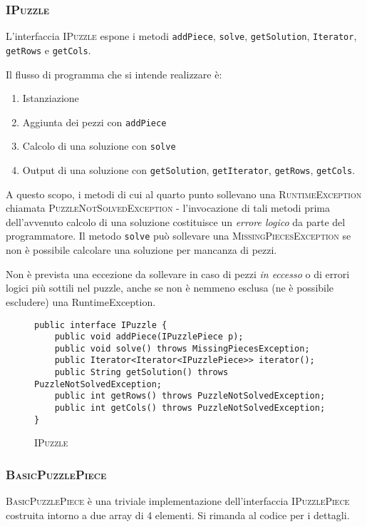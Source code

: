 \documentclass[a4paper]{article}
\newcommand{\Classname}[1]{\textsc{#1}}
\newcommand{\Ifacename}[1]{\textsc{#1}}
\newcommand{\Methodname}[1]{\texttt{#1}}
\begin{document}
\subsubsection{\Classname{IPuzzle}}
L'interfaccia \Ifacename{IPuzzle} espone i metodi \Methodname{addPiece}, \Methodname{solve}, \Methodname{getSolution}, \Methodname{Iterator}, \Methodname{getRows} e \Methodname{getCols}.

Il flusso di programma che si intende realizzare \`e:

\begin{enumerate}
\item Istanziazione
\item Aggiunta dei pezzi con \Methodname{addPiece}
\item Calcolo di una soluzione con \Methodname{solve}
\item Output di una soluzione con \Methodname{getSolution}, \Methodname{getIterator}, \Methodname{getRows}, \Methodname{getCols}.
\end{enumerate}

A questo scopo, i metodi di cui al quarto punto sollevano una \Classname{RuntimeException} chiamata \Classname{PuzzleNotSolvedException} - l'invocazione di tali metodi prima dell'avvenuto calcolo di una soluzione costituisce un \emph{errore logico} da parte del programmatore.
\label{pnse}
Il metodo \Methodname{solve} pu\`o sollevare una \Classname{MissingPiecesException} se non \`e possibile calcolare una soluzione per mancanza di pezzi.

Non \`e prevista una eccezione da sollevare in caso di pezzi \emph{in eccesso} o di errori logici pi\`u  sottili nel puzzle, anche se non \`e nemmeno esclusa (ne \`e possibile escludere) una RuntimeException.

\begin{figure}[h]
  \centering
\begin{lstlisting}[frame=single]
public interface IPuzzle {
	public void addPiece(IPuzzlePiece p);
	public void solve() throws MissingPiecesException;
	public Iterator<Iterator<IPuzzlePiece>> iterator();
	public String getSolution() throws PuzzleNotSolvedException;
	public int getRows() throws PuzzleNotSolvedException;
	public int getCols() throws PuzzleNotSolvedException;
}
\end{lstlisting}
\caption {\textsc{IPuzzle}}
\end{figure}

\subsubsection{\Classname{BasicPuzzlePiece}}
\Classname{BasicPuzzlePiece} \`e una triviale implementazione dell'interfaccia \Ifacename{IPuzzlePiece} costruita intorno a due array di 4 elementi.
Si rimanda al codice per i dettagli.
\end{document}
